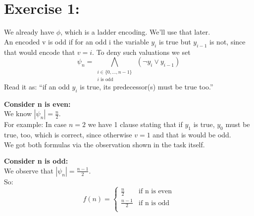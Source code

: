 \documentclass{base}
\begin{document}



\section*{Exercise 1: }

We already have $\phi$, which is a ladder encoding. We'll use that later.\\
An encoded v is odd if for an odd i the variable $y_i$ is true but $y_{i-1}$ is not, since that would encode that $v=i$.
To deny such valuations we set
$$\psi_n = \bigwedge_{\substack{i \in \{0,\dots,n-1\} \\ i\text{ is odd}}}\ (\neg y_i \lor y_{i-1})$$
Read it as: ``if an odd $y_i$ is true, its predecessor(s) must be true too.''

\textbf{Consider n is even:} \\
We know $|\psi_n| = \frac{n}{2}$. \\
For example: In case $n=2$ we have 1 clause stating that if $y_1$ is true, $y_0$ must be true, too, which is correct, since otherwise $v=1$ and that is would be odd. \\
We got both formulas via the observation shown in the task itself.

\textbf{Consider n is odd:} \\
We observe that $|\psi_n| = \frac{n-1}{2}$. \\

So:
$$f(n) = \begin{cases} 
        \frac{n}{2} & \text{if n is even} \\
        \frac{n-1}{2} & \text{if n is odd} \\
    \end{cases}
$$
\end{document}
